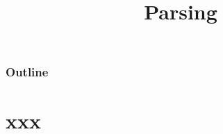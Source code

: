 \documentclass[8pt,a4paper,compress]{beamer}
\title{Parsing}
\date{}
\begin{document}
\begin{frame}
\vfill
\titlepage
\end{frame}

\begin{frame}
\frametitle{Outline}
\tableofcontents
\end{frame}

\section{xxx}
\begin{frame}[fragile]
\pause


\end{frame}
\end{document}

